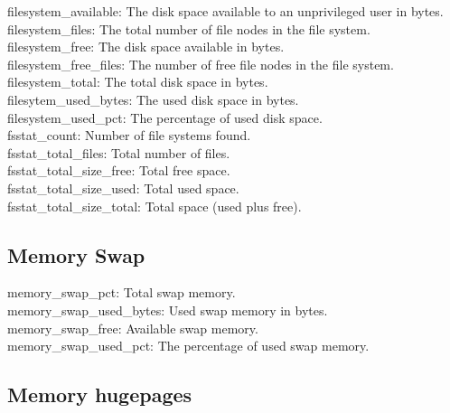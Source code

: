 \documentclass{iosart2c}
\begin{document}
filesystem\_available: The disk space available to an unprivileged user in bytes.\\

filesystem\_files: The total number of file nodes in the file system.\\

filesystem\_free: The disk space available in bytes.\\

filesystem\_free\_files: The number of free file nodes in the file system.\\

filesystem\_total: The total disk space in bytes.\\

filesytem\_used\_bytes: The used disk space in bytes.\\

filesystem\_used\_pct: The percentage of used disk space.\\

fsstat\_count: Number of file systems found.\\

fsstat\_total\_files: Total number of files.\\

fsstat\_total\_size\_free: Total free space.\\

fsstat\_total\_size\_used: Total used space.\\

fsstat\_total\_size\_total: Total space (used plus free).\\

\subsection{Memory Swap}

memory\_swap\_pct: Total swap memory.\\

memory\_swap\_used\_bytes: Used swap memory in bytes.\\

memory\_swap\_free: Available swap memory.\\

memory\_swap\_used\_pct: The percentage of used swap memory.\\


\subsection{Memory hugepages}
\end{document}
